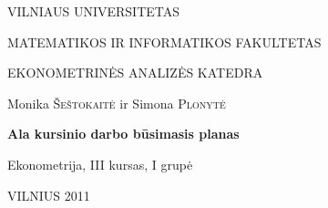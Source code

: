 \documentclass[a4paper]{article}
\begin{document}
\begin{titlepage}
\centerline{ \large VILNIAUS UNIVERSITETAS}
\bigskip
\centerline{\large MATEMATIKOS IR INFORMATIKOS FAKULTETAS}
\smallskip

\centerline{\large  EKONOMETRINĖS ANALIZĖS KATEDRA}
\vskip 200pt
\centerline{ \large Monika \textsc{Šeštokaitė} ir \large Simona \textsc{Plonytė}}
\vskip 50pt
\centerline{\bf \Large Ala kursinio darbo būsimasis planas}
\bigskip
\vskip 50pt
\hfill Ekonometrija, III kursas, I grupė
\vskip 100pt
\centerline{\large VILNIUS 2011}

\end{titlepage}
\end{document}
